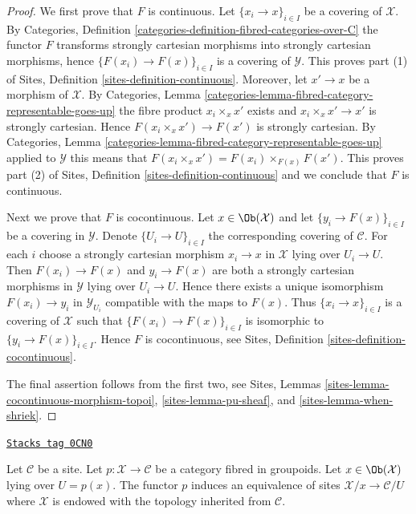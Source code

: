 \begin{proof}
We first prove that $F$ is continuous.
Let $\{x_i \to x\}_{i \in I}$ be a covering of $\mathcal{X}$. By
Categories, Definition \ref{categories-definition-fibred-categories-over-C}
the functor $F$ transforms strongly cartesian morphisms into strongly
cartesian morphisms, hence $\{F(x_i) \to F(x)\}_{i \in I}$ is a covering
of $\mathcal{Y}$. This proves part (1) of
Sites, Definition \ref{sites-definition-continuous}.
Moreover, let $x' \to x$ be a morphism of $\mathcal{X}$. By
Categories, Lemma \ref{categories-lemma-fibred-category-representable-goes-up}
the fibre product $x_i \times_x x'$ exists and $x_i \times_x x' \to x'$
is strongly cartesian. Hence $F(x_i \times_x x') \to F(x')$ is strongly
cartesian. By
Categories, Lemma \ref{categories-lemma-fibred-category-representable-goes-up}
applied to $\mathcal{Y}$ this means that
$F(x_i \times_x x') = F(x_i) \times_{F(x)} F(x')$.
This proves part (2) of
Sites, Definition \ref{sites-definition-continuous}
and we conclude that $F$ is continuous.

\medskip\noindent
Next we prove that $F$ is cocontinuous.
Let $x \in \Ob(\mathcal{X})$ and let $\{y_i \to F(x)\}_{i \in I}$
be a covering in $\mathcal{Y}$. Denote $\{U_i \to U\}_{i \in I}$ the
corresponding covering of $\mathcal{C}$. For each $i$ choose a strongly
cartesian morphism $x_i \to x$ in $\mathcal{X}$ lying over $U_i \to U$.
Then $F(x_i) \to F(x)$ and $y_i \to F(x)$ are both a strongly cartesian
morphisms in $\mathcal{Y}$ lying over $U_i \to U$. Hence there exists
a unique isomorphism $F(x_i) \to y_i$ in $\mathcal{Y}_{U_i}$ compatible
with the maps to $F(x)$. Thus $\{x_i \to x\}_{i \in I}$ is a covering of
$\mathcal{X}$ such that $\{F(x_i) \to F(x)\}_{i \in I}$ is isomorphic to
$\{y_i \to F(x)\}_{i \in I}$. Hence $F$ is cocontinuous, see
Sites, Definition \ref{sites-definition-cocontinuous}.

\medskip\noindent
The final assertion follows from the first two, see
Sites, Lemmas
\ref{sites-lemma-cocontinuous-morphism-topoi},
\ref{sites-lemma-pu-sheaf}, and
\ref{sites-lemma-when-shriek}.
\end{proof}

\begin{lemma}[Localizing]
\label{stacks-lemma-localizing}
\href{https://stacks.math.columbia.edu/tag/0CN0}{\texttt{Stacks tag 0CN0}}

Let $\mathcal{C}$ be a site. Let $p : \mathcal{X} \to \mathcal{C}$
be a category fibred in groupoids. Let $x \in \Ob(\mathcal{X})$
lying over $U = p(x)$. The functor $p$ induces an equivalence of sites
$\mathcal{X}/x \to \mathcal{C}/U$ where $\mathcal{X}$ is endowed with
the topology inherited from $\mathcal{C}$.
\end{lemma}

